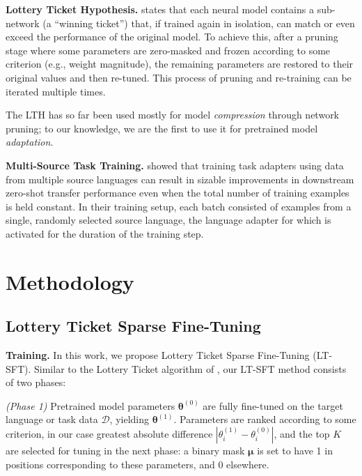  \textbf{Lottery Ticket Hypothesis.} \citep[LTH;][]{frankle2018the,pmlr-v119-malach20a} states that each neural model contains a sub-network (a ``winning ticket'') that, if trained again in isolation, can match or even exceed the performance of the original model. To achieve this, after a pruning stage where some parameters are zero-masked and frozen according to some criterion (e.g., weight magnitude), the remaining parameters are restored to their original values and then re-tuned. This process of pruning and re-training can be iterated multiple times. 

The LTH has so far been used mostly for model \textit{compression} through network pruning; to our knowledge, we are the first to use it for pretrained model \textit{adaptation}. 

 \textbf{Multi-Source Task Training.}
\citet{ansell-etal-2021-mad-g} showed that training task adapters using data from multiple source languages can result in sizable improvements in downstream zero-shot transfer performance even when the total number of training examples is held constant. In their training setup, each batch consisted of examples from a single, randomly selected source language, the language adapter for which is activated for the duration of the training step.

\section{Methodology}
\label{sec:methodology}

\subsection{Lottery Ticket Sparse Fine-Tuning} \label{sec:lt-sft}

 \textbf{Training.} In this work, we propose Lottery Ticket Sparse Fine-Tuning (LT-SFT). Similar to the Lottery Ticket algorithm of \citet{frankle2018the}, our LT-SFT method consists of two phases:

 \textit{(Phase 1)} Pretrained model parameters $\bm{\theta}^{(0)}$ are fully fine-tuned on the target language or task data $\mathcal{D}$, yielding $\bm{\theta}^{(1)}$. Parameters are ranked according to some criterion, in our case greatest absolute difference $|\theta_i^{(1)} - \theta_i^{(0)}|$, and the top $K$ are selected for tuning in the next phase: a binary mask $\bm{\mu}$ is set to have 1 in positions corresponding to these parameters, and 0 elsewhere.

